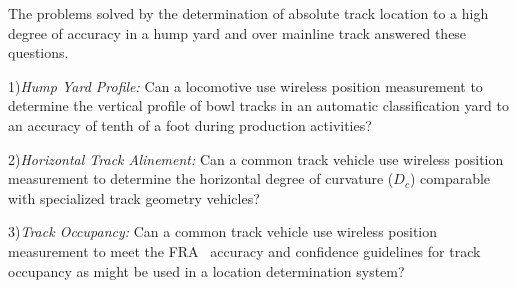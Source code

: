 The problems solved by the determination of absolute track location to a high degree of accuracy in a hump yard and over mainline track answered these questions.

1)\emph{Hump Yard Profile:}
Can a locomotive use wireless position measurement to determine the vertical profile of bowl tracks in an automatic classification yard to an accuracy of tenth of a foot during production activities?

2)\emph{Horizontal Track Alinement:}
Can a common track vehicle use wireless position measurement to determine the horizontal degree of curvature ($D_c$) comparable with specialized track geometry vehicles?

3)\emph{Track Occupancy:}
Can a common track vehicle use wireless position measurement to meet the FRA~\citep[pp.6-7]{1995FRADiffe} accuracy and confidence guidelines for track occupancy as might be used in a location determination system?

